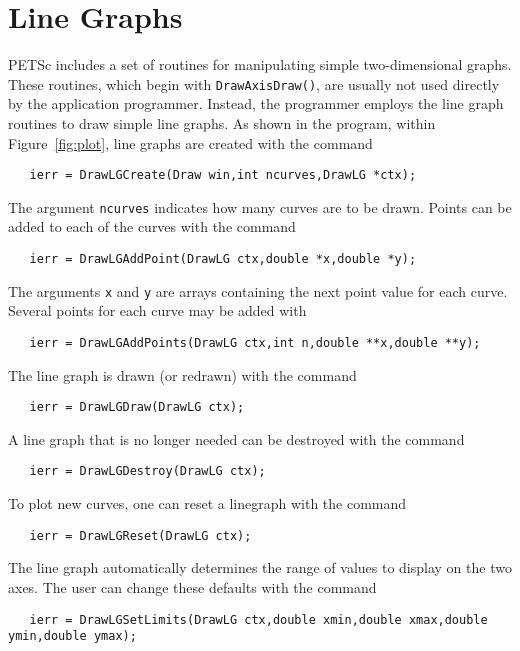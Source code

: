 {\section{Line Graphs}
PETSc includes a set of routines for manipulating simple two-dimensional
graphs. These routines, which begin with {\tt DrawAxisDraw()}, are usually 
not used directly by the application programmer.  Instead, the programmer 
employs the line graph routines to draw simple line graphs.
As shown in the program, within Figure~\ref{fig:plot}, line graphs 
are created with the command  
\begin{verbatim}
   ierr = DrawLGCreate(Draw win,int ncurves,DrawLG *ctx);
\end{verbatim}
The argument {\tt ncurves} indicates how many curves are to be drawn.
Points can be added to each of the curves with the 
command 
\begin{verbatim}
   ierr = DrawLGAddPoint(DrawLG ctx,double *x,double *y);
\end{verbatim}
The arguments {\tt x} and {\tt y} are arrays containing the next 
point value for each curve.
Several points for each curve may be added with 
\begin{verbatim}
   ierr = DrawLGAddPoints(DrawLG ctx,int n,double **x,double **y);
\end{verbatim}

The line graph is drawn (or redrawn) with the command 
\begin{verbatim}
   ierr = DrawLGDraw(DrawLG ctx);
\end{verbatim}
A line graph that is no longer needed can be destroyed with the 
command 
\begin{verbatim}
   ierr = DrawLGDestroy(DrawLG ctx);
\end{verbatim}
To plot new curves, one can reset a linegraph with the
command 
\begin{verbatim}
   ierr = DrawLGReset(DrawLG ctx);
\end{verbatim}
The line graph automatically determines the range of values to 
display on the two axes.  The user can change these defaults with the 
command 
\begin{verbatim}
   ierr = DrawLGSetLimits(DrawLG ctx,double xmin,double xmax,double ymin,double ymax);
\end{verbatim}

}
